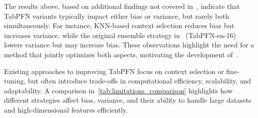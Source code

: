 The results above, based on additional findings not covered in~\cite{SF_PFN}, indicate that TabPFN variants typically impact either bias or variance, but rarely both simultaneously. For instance, KNN-based context selection reduces bias but increases variance, while the original ensemble strategy in~\citet{Hollmann2022TabPFN} (TabPFN-en-16) lowers variance but may increase bias. These observations highlight the need for a method that jointly optimizes both aspects, motivating the development of~\name.  

Existing approaches to improving TabPFN focus on context selection or fine-tuning, but often introduce trade-offs in computational efficiency, scalability, and adaptability. A comparison in~\autoref{tab:limitations_comparison} highlights how different strategies affect bias, variance, and their ability to handle large datasets and high-dimensional features efficiently.

